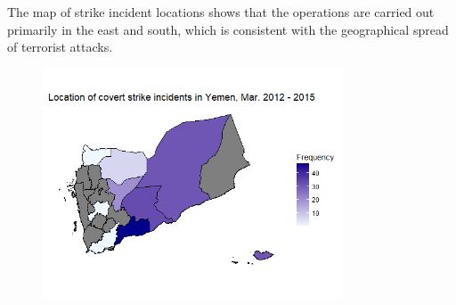 \documentclass[letterpaper,12pt]{article}
\theoremstyle{definition}
\begin{document}
The map of strike incident locations shows that the operations are carried out primarily in the east and south, which is consistent with the geographical spread of terrorist attacks.

\begin{figure}[htb!]
  \includegraphics[width=3.5in]{strike_map.png}
\end{figure}
\end{document}
